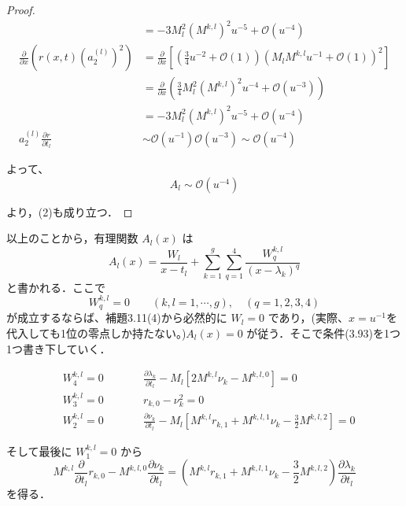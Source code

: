 \documentclass[paper=a4, fontsize=11pt]{jlreq} %
\newenvironment{story}{%
  \begin{mdframed}[
    backgroundcolor=red!5, %
    linewidth=0pt,         %
    innertopmargin=10pt,   %
    innerbottommargin=10pt,
    innerrightmargin=10pt, %
    innerleftmargin=10pt
  ]%
}{%
  \end{mdframed}%
}
\theoremstyle{break}
\theoremstyle{qa}
\begin{document}
\begin{story}
\begin{proof}
\begin{align*}
    &= -3 M_l^2 \left(M^{k,l}\right)^2 u^{-5} + \mathcal{O}(u^{-4}) \\[8pt]
    \frac{\partial}{\partial x} \left( r(x,t) (a_2^{(l)})^2 \right) &= \frac{\partial}{\partial x} \left[ \left( \frac{3}{4} u^{-2} + \mathcal{O}(1) \right) \left( M_l M^{k,l} u^{-1} + \mathcal{O}(1) \right)^2 \right] \\
    &= \frac{\partial}{\partial x} \left( \frac{3}{4} M_l^2 \left(M^{k,l}\right)^2 u^{-4} + \mathcal{O}(u^{-3}) \right) \\
    &= -3 M_l^2 \left(M^{k,l}\right)^2 u^{-5} + \mathcal{O}(u^{-4}) \\[8pt]
    a_2^{(l)} \frac{\partial r}{\partial t_l} &\sim \mathcal{O}(u^{-1}) \mathcal{O}(u^{-3}) \sim \mathcal{O}(u^{-4})
\end{align*}

よって、
\begin{equation*}
    A_l \sim \mathcal{O}(u^{-4})
\end{equation*}

より，(2)も成り立つ．
\end{proof}

\vspace{1em}
以上のことから，有理関数 $A_l(x)$ は
\[
    A_l(x) = \frac{W_l}{x-t_l} + \sum_{k=1}^g \sum_{q=1}^4 \frac{W_q^{k,l}}{(x-\lambda_k)^q}
\]
と書かれる．ここで
\begin{equation} \tag{3.93}
    W_q^{k,l} = 0 \qquad (k, l = 1, \cdots, g), \quad (q = 1, 2, 3, 4)
\end{equation}
が成立するならば、補題3.11(4)から必然的に $W_l=0$ であり，(実際、$x=u^{-1}$を代入しても1位の零点しか持たない。)$A_l(x)=0$ が従う．そこで条件(3.93)を1つ1つ書き下していく．

\begin{align*}
    &W_4^{k,l} = 0 \qquad &&\frac{\partial \lambda_k}{\partial t_l} - M_l \left[ 2M^{k,l}\nu_k - M^{k,l,0} \right] = 0 \\[8pt]
    &W_3^{k,l} = 0 \qquad &&r_{k,0} - \nu_k^2 = 0 \\[8pt]
    &W_2^{k,l} = 0 \qquad &&\frac{\partial \nu_k}{\partial t_l} - M_l \left[ M^{k,l}r_{k,1} + M^{k,l,1}\nu_k - \frac{3}{2}M^{k,l,2} \right] = 0
\end{align*}

そして最後に $W_1^{k,l}=0$ から
\[
    M^{k,l} \frac{\partial}{\partial t_l} r_{k,0} - M^{k,l,0} \frac{\partial \nu_k}{\partial t_l} = \left( M^{k,l}r_{k,1} + M^{k,l,1}\nu_k - \frac{3}{2}M^{k,l,2} \right) \frac{\partial \lambda_k}{\partial t_l}
\]
を得る．
\end{story}
\end{document}
